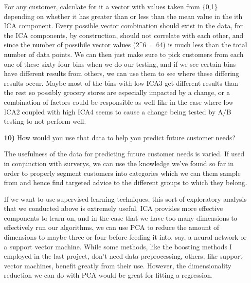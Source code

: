 \documentclass{article}
\begin{document}
For any customer, calculate for it a vector with values taken from
\{0,1\} depending on whether it has greater than or less than the mean
value in the ith ICA component. Every possible vector combination should
exist in the data, for the ICA components, by construction, should not
correlate with each other, and since the number of possibile vector
values (2\^{}6 = 64) is much less than the total number of data points.
We can then just make sure to pick customers from each one of these
sixty-four bins when we do our testing, and if we see certain bins have
different results from others, we can use them to see where these
differing results occur. Maybe most of the bins with low ICA3 get
different results than the rest so possibly grocery stores are
especially impacted by a change, or a combination of factors could be
responsible as well like in the case where low ICA2 coupled with high
ICA4 seems to cause a change being tested by A/B testing to not perform
well.

    \textbf{10)} How would you use that data to help you predict future
customer needs?

    The usefulness of the data for predicting future customer needs is
varied. If used in conjunction with surverys, we can use the knowledge
we've found so far in order to properly segment customers into
categories which we can them sample from and hence find targeted advice
to the different groups to which they belong.

If we want to use supervised learning techniques, this sort of
exploratory analysis that we conducted above is extremely useful. ICA
provides more effective components to learn on, and in the case that we
have too many dimensions to effectively run our algorithms, we can use
PCA to reduce the amount of dimensions to maybe three or four before
feeding it into, say, a neural network or a support vector machine.
While some methods, like the boosting methods I employed in the last
project, don't need data preprocessing, others, like support vector
machines, benefit greatly from their use. However, the dimensionality
reduction we can do with PCA would be great for fitting a regression.


    
    
    
    
\end{document}
